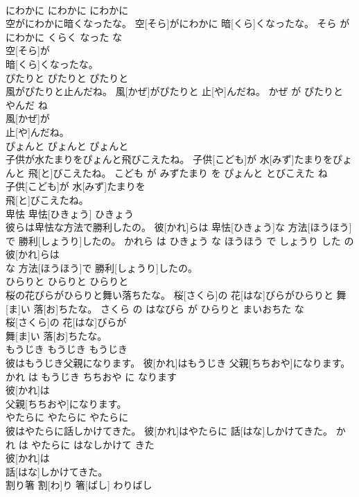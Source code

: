 \documentclass[8pt]{extreport}
\begin{document}
\begin{CJK}{UTF8}{min}
\\	にわかに	にわかに	にわかに	
\\	空がにわかに暗くなったな。	空[そら]がにわかに 暗[くら]くなったな。	そら が にわかに くらく なった な	
\\	空[そら]が
\\	暗[くら]くなったな。			
\\	ぴたりと	ぴたりと	ぴたりと	
\\	風がぴたりと止んだね。	風[かぜ]がぴたりと 止[や]んだね。	かぜ が ぴたりと やんだ ね	
\\	風[かぜ]が
\\	止[や]んだね。			
\\	ぴょんと	ぴょんと	ぴょんと	
\\	子供が水たまりをぴょんと飛びこえたね。	子供[こども]が 水[みず]たまりをぴょんと 飛[と]びこえたね。	こども が みずたまり を ぴょんと とびこえた ね	
\\	子供[こども]が 水[みず]たまりを
\\	飛[と]びこえたね。			
\\	卑怯	卑怯[ひきょう]	ひきょう	
\\	彼らは卑怯な方法で勝利したの。	彼[かれ]らは 卑怯[ひきょう]な 方法[ほうほう]で 勝利[しょうり]したの。	かれら は ひきょう な ほうほう で しょうり した の	
\\	彼[かれ]らは
\\	な 方法[ほうほう]で 勝利[しょうり]したの。			
\\	ひらりと	ひらりと	ひらりと	
\\	桜の花びらがひらりと舞い落ちたな。	桜[さくら]の 花[はな]びらがひらりと 舞[ま]い 落[お]ちたな。	さくら の はなびら が ひらりと まいおちた な	
\\	桜[さくら]の 花[はな]びらが
\\	舞[ま]い 落[お]ちたな。			
\\	もうじき	もうじき	もうじき	
\\	彼はもうじき父親になります。	彼[かれ]はもうじき 父親[ちちおや]になります。	かれ は もうじき ちちおや に なります	
\\	彼[かれ]は
\\	父親[ちちおや]になります。			
\\	やたらに	やたらに	やたらに	
\\	彼はやたらに話しかけてきた。	彼[かれ]はやたらに 話[はな]しかけてきた。	かれ は やたらに はなしかけて きた	
\\	彼[かれ]は
\\	話[はな]しかけてきた。			
\\	割り箸	割[わ]り 箸[ばし]	わりばし	

\end{CJK}
\end{document}
